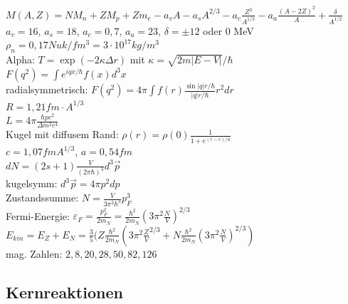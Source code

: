 \documentclass[12pt,a4paper]{article}
\renewcommand{\=}[1]{\stackrel{#1}{=}}
\theoremstyle{definition}
\theoremstyle{remark}
\begin{document}
$M(A,Z) = N M_n + Z M_p + Z m_e - a_v A - a_s A^{2/3} - a_c \frac{Z^2}{A^{1/3}} - a_a \frac{(A-2Z)^2}{A} + \frac{\delta}{A^{1/2}}$\\
$a_v = 16$, $a_s = 18$, $a_c = 0,7$, $a_a = 23$, $\delta = \pm 12$ oder $0$ MeV\\
$\rho_n = 0,17 Nuk/fm^3 = 3 \cdot 10^{17} kg/m^3$\\
Alpha:
$T = \exp (-2 \kappa \Delta r)$ mit $\kappa = \sqrt{2m |E-V|}/\hbar$\\
$F(q^2) = \int e^{i q x/\hbar} f(x) d^3x$\\
radialsymmetrisch: $F(q^2) = 4\pi \int f(r) \frac{\sin |q| r/\hbar}{|q|r/\hbar}r^2 dr$\\
$R = 1,21 fm \cdot A^{1/3}$\\
$L = 4\pi \frac{\hbar p c^2}{\Delta m^2 c^4}$\\
Kugel mit diffusem Rand: $\rho(r) = \rho(0) \frac{1}{1+e^{(r-c)/a}}$\\
$c = 1,07 fm A^{1/3}$, $a = 0,54 fm$\\
$dN = (2s+1) \frac{V}{(2\pi \hbar)^3} d^3\vec p$\\
kugelsymm: $d^3 \vec p = 4\pi p^2 dp$\\
Zustandssumme: $N = \frac{V}{3\pi^2 \hbar^3} p_F^3$\\
Fermi-Energie: $\varepsilon_F = \frac{p_F^2}{2m_N} = \frac{\hbar^2}{2m_N} (3\pi^2 \frac{N}{V})^{2/3}$\\
$E_{kin} = E_Z + E_N = \frac{3}{5} (Z \frac{\hbar^2}{2m_N} (3\pi^2 \frac{Z}{V}^{2/3} + N \frac{\hbar^2}{2m_N} (3\pi^2 \frac{N}{V})^{2/3})$\\
mag. Zahlen: $2, 8, 20, 28, 50, 82, 126$

\subsection{Kernreaktionen}

\begin{center}
\begin{minipage}[t]{.35\linewidth}
\vspace{0pt}
\noindent\begin{tabular}{ll}
\toprule

\bottomrule
\end{tabular}
\end{minipage}%
\begin{minipage}[t]{.65\linewidth}
\vspace{0pt}
\begin{tabular}{ll}
\toprule


\end{tabular}
\end{minipage}
\end{center}
\end{document}
